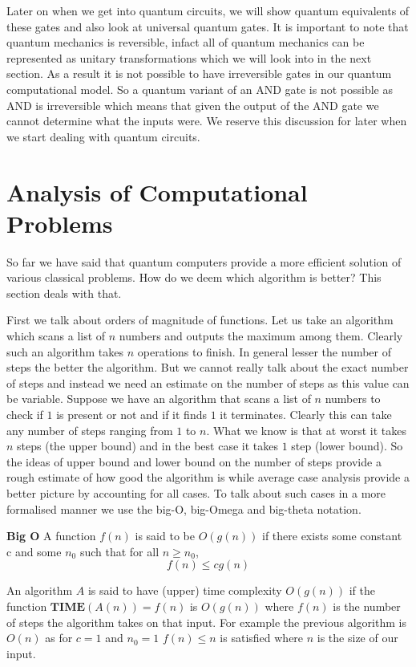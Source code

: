 Later on when we get into quantum circuits, we will show quantum equivalents of these gates and also look at universal quantum gates. It is important to note that quantum mechanics is reversible, infact all of quantum mechanics can be represented as unitary transformations which we will look into in the next section. As a result it is not possible to have irreversible gates in our quantum computational model. So a quantum variant of an AND gate is not possible as AND is irreversible which means that given the output of the AND gate we cannot determine what the inputs were. We reserve this discussion for later when we start dealing with quantum circuits.

\section{Analysis of Computational Problems}

So far we have said that quantum computers provide a more efficient solution of various classical problems. How do we deem which algorithm is better? This section deals with that.

First we talk about orders of magnitude of functions. Let us take an algorithm which scans a list of $n$ numbers and outputs the maximum among them. Clearly such an algorithm takes $n$ operations to finish. In general lesser the number of steps the better the algorithm. But we cannot really talk about the exact number of steps and instead we need an estimate on the number of steps as this value can be variable. Suppose we have an algorithm that scans a list of $n$ numbers to check if $1$ is present or not and if it finds $1$ it terminates. Clearly this can take any number of steps ranging from $1$ to $n$. What we know is that at worst it takes $n$ steps (the upper bound) and in the best case it takes $1$ step (lower bound). So the ideas of upper bound and lower bound on the number of steps provide a rough estimate of how good the algorithm is while average case analysis provide a better picture by accounting for all cases. To talk about such cases in a more formalised manner we use the big-O, big-Omega and big-theta notation.

\begin{definition}
\textbf{Big O} A function $f(n)$ is said to be $O(g(n))$ if there exists some constant c and some $n_0$ such that for all $n \geq n_0$, $$ f(n) \leq cg(n)$$
\end{definition}
An algorithm $A$ is said to have (upper) time complexity $O(g(n))$ if the function $\textbf{TIME}(A(n)) = f(n)$ is $O(g(n))$ where $f(n)$ is the number of steps the algorithm takes on that input.
For example the previous algorithm is $O(n)$ as for $c = 1$ and $n_0 = 1$
$f(n) \leq n$ is satisfied where $n$ is the size of our input.

